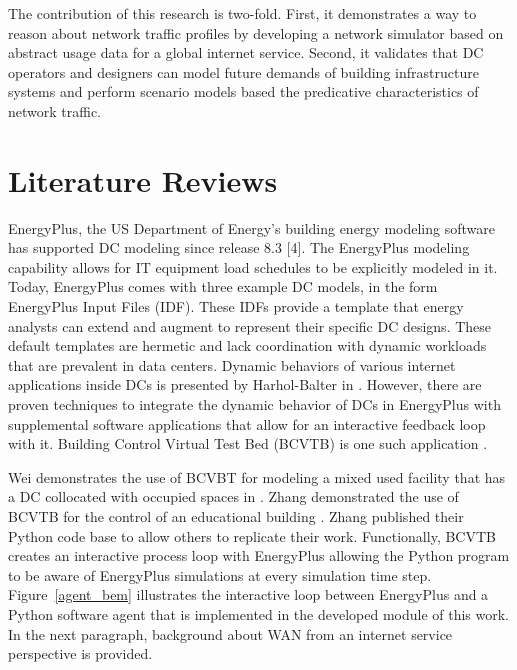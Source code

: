     The contribution of this research is two-fold. First, it demonstrates a way to reason about network traffic profiles by developing a network simulator based on abstract usage data for a global internet service. Second, it validates that DC operators and designers can model future demands of building infrastructure systems and perform scenario models based the predicative characteristics of network traffic. 
    
\section{Literature Reviews}
    EnergyPlus, the US Department of Energy’s building energy modeling software has supported DC modeling since release 8.3 [4]. The EnergyPlus modeling capability allows for IT equipment load schedules to be explicitly modeled in it. Today, EnergyPlus comes with three example DC models, in the form EnergyPlus Input Files (IDF). These IDFs provide a template that energy analysts can extend and augment to represent their specific DC designs. These default templates are hermetic and lack coordination with dynamic workloads that are prevalent in data centers. Dynamic behaviors of various internet applications inside DCs is presented by Harhol-Balter in \cite{harchol13}. However, there are proven techniques to integrate the dynamic behavior of DCs in EnergyPlus with supplemental software applications that allow for an interactive feedback loop with it. Building Control Virtual Test Bed (BCVTB) is one such application \cite{EnergyPlus8.3}. 
    
    Wei demonstrates the use of BCVBT for modeling a mixed used facility that has a DC collocated with occupied spaces in \cite{wei17}. Zhang demonstrated the use of BCVTB for the control of an educational building \cite{zhang19}. Zhang published their Python code base to allow others to replicate their work. Functionally, BCVTB creates an interactive process loop with EnergyPlus allowing the Python program to be aware of EnergyPlus simulations at every simulation time step. Figure~\ref{agent_bem} illustrates the interactive loop between EnergyPlus and a Python software agent that is implemented in the developed module of this work. In the next paragraph, background about WAN from an internet service perspective is provided. 
    
    
    
